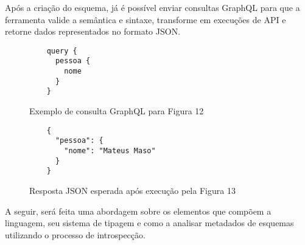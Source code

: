 Após a criação do esquema, já é possível enviar consultas GraphQL para que a ferramenta valide a semântica e sintaxe, transforme em execuções de API e retorne dados representados no formato JSON.  \cite{GraphQL2016}

\begin{figure}[H]
  \centering
  \begin{verbatim}
    query {
      pessoa {
        nome
      }
    }
  \end{verbatim}
  \caption{Exemplo de consulta GraphQL para Figura 12}
\end{figure}

\begin{figure}[H]
  \centering
  \begin{verbatim}
    {
      "pessoa": {
        "nome": "Mateus Maso"
      }
    }
  \end{verbatim}
  \caption{Resposta JSON esperada após execução pela Figura 13}
\end{figure}

A seguir, será feita uma abordagem sobre os elementos que compõem a linguagem, seu sistema de tipagem e como a analisar metadados de esquemas utilizando o processo de introspecção.




